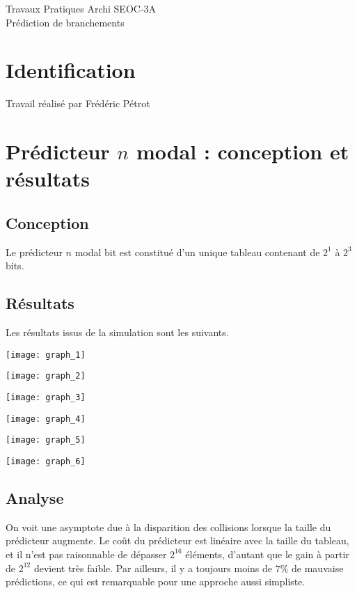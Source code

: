 \documentclass[a4paper]{article}
\begin{document}
\begin{center}
\large
Travaux Pratiques Archi SEOC-3A\\
\LARGE
Prédiction de branchements\\
\large

\end{center}
\section{Identification}
Travail réalisé par Frédéric Pétrot

\section{Prédicteur $n$ modal : conception et résultats}
\subsection{Conception}
Le prédicteur $n$ modal bit est constitué d'un unique tableau contenant de $2^1$ à $2^3$ bits.

\subsection{Résultats}
Les résultats issus de la simulation sont les suivants.
\par
\begin{minipage}{.48\linewidth}
\texttt{[image: graph\_1]}
\end{minipage}%
\hfill
\begin{minipage}{.48\linewidth}
\texttt{[image: graph\_2]}
\end{minipage}

\begin{minipage}{.48\linewidth}
\texttt{[image: graph\_3]}
\end{minipage}%
\hfill
\begin{minipage}{.48\linewidth}
\texttt{[image: graph\_4]}
\end{minipage}

\begin{minipage}{.48\linewidth}
\texttt{[image: graph\_5]}
\end{minipage}%
\hfill
\begin{minipage}{.48\linewidth}
\texttt{[image: graph\_6]}
\end{minipage}
\subsection{Analyse}
On voit une asymptote due à la disparition des collisions lorsque la taille du prédicteur augmente.
Le coût du prédicteur est linéaire avec la taille du tableau, et il n'est pas raisonnable de dépasser $2^{16}$ éléments, d'autant que le gain à partir de $2^{12}$ devient très faible.
Par ailleurs, il y a toujours moins de $7\%$ de mauvaise prédictions, ce qui est remarquable pour une approche aussi simpliste.
\end{document}
